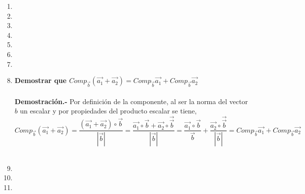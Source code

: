 \begin{enumerate}
\item 

\item 

\item 

\item 

\item 

\item 

\item 

\item \textbf{\boldmath Demostrar que $Comp_{\vec{b}}\left(\vec{a_1}+\vec{a_2}\right) = Comp_{\vec{b}}\vec{a_1} + Comp_{\vec{b}}\vec{a_2}$\\\\
    Demostración.-}\; Por definición de la componente, al ser la norma del vector $b$ un escalar y por propiedades del producto escalar se tiene, 
    $$Comp_{\vec{b}}\left(\vec{a_1}+\vec{a_2}\right) = \dfrac{\left(\vec{a_1}+\vec{a_2}\right)\circ \vec{b}}{|\vec{b}|}=\dfrac{\vec{a_1}\circ \vec{b} + \vec{a_2} \circ \vec{\vec{b}}}{|\vec{b}|} = \dfrac{\vec{a_1}\circ \vec{b}}{\vec{b}} + \dfrac{\vec{a_2} \circ \vec{\vec{b}}}{|\vec{b}|} =  Comp_{\vec{b}}\vec{a_1} + Comp_{\vec{b}}\vec{a_2}$$\\

\item 

\item 

\item 


\end{enumerate}
